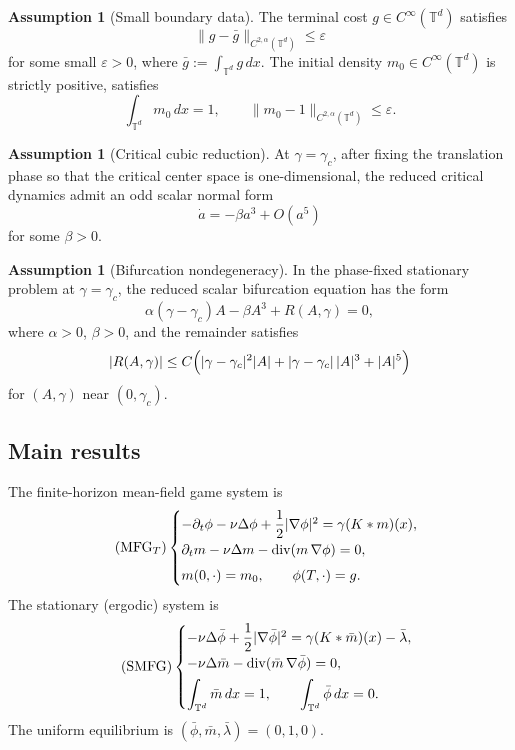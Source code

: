 \documentclass[11pt]{amsart}
\theoremstyle{definition}
\newtheorem{assumption}[theorem]{Assumption}
\theoremstyle{remark}
\newcommand{\Td}{\mathbb{T}^d}
\newcommand{\bphi}{\bar{\phi}}
\newcommand{\barm}{\bar{m}}
\newcommand{\blam}{\bar{\lambda}}
\newcommand{\gamc}{\gamma_c}
\newcommand{\Div}{\operatorname{div}}
\newcommand{\grad}{\nabla}
\newcommand{\eps}{\varepsilon}
\begin{document}
\begin{assumption}[Small boundary data]
\label{ass:small-data}
The terminal cost $g\in C^\infty(\Td)$ satisfies
\[
\|g-\bar g\|_{C^{2,\alpha}(\Td)}\le \eps
\]
for some small $\eps>0$, where $\bar g := \int_{\Td}g\,dx$.
The initial density $m_0\in C^\infty(\Td)$ is strictly positive, satisfies
\[
\int_{\Td}m_0\,dx=1,
\qquad
\|m_0-1\|_{C^{2,\alpha}(\Td)}\le \eps.
\]
\end{assumption}

\begin{assumption}[Critical cubic reduction]
\label{ass:critical-cubic}
At $\gamma=\gamc$, after fixing the translation phase so that the critical center space is one-dimensional, the reduced critical dynamics admit an odd scalar normal form
\[
\dot a = -\beta a^3 + O(a^5)
\]
for some $\beta>0$.
\end{assumption}

\begin{assumption}[Bifurcation nondegeneracy]
\label{ass:bif-nondeg}
In the phase-fixed stationary problem at $\gamma=\gamc$, the reduced scalar bifurcation equation has the form
\[
\alpha(\gamma-\gamc)A-\beta A^3 + R(A,\gamma)=0,
\]
where $\alpha>0$, $\beta>0$, and the remainder satisfies
\[
|R(A,\gamma)|\le C\Bigl(|\gamma-\gamc|^2|A| + |\gamma-\gamc|\,|A|^3 + |A|^5\Bigr)
\]
for $(A,\gamma)$ near $(0,\gamc)$.
\end{assumption}

\subsection{Main results}
\label{sub:main-results}

The finite-horizon mean-field game system is
\begin{equation}
\label{eq:MFG}
\tag{$\mathrm{MFG}_T$}
\begin{cases}
-\partial_t \phi - \nu\Delta \phi + \dfrac12|\grad\phi|^2 = \gamma(K*m)(x), \\[4pt]
\partial_t m - \nu\Delta m - \Div(m\,\grad\phi)=0, \\[4pt]
m(0,\cdot)=m_0,\qquad \phi(T,\cdot)=g.
\end{cases}
\end{equation}
The stationary (ergodic) system is
\begin{equation}
\label{eq:SMFG}
\tag{$\mathrm{SMFG}$}
\begin{cases}
-\nu\Delta \bphi + \dfrac12|\grad\bphi|^2 = \gamma(K*\barm)(x)-\blam, \\[4pt]
-\nu\Delta \barm - \Div(\barm\,\grad\bphi)=0, \\[4pt]
\displaystyle \int_{\Td}\barm\,dx=1,\qquad \displaystyle \int_{\Td}\bphi\,dx=0.
\end{cases}
\end{equation}
The uniform equilibrium is $(\bphi,\barm,\blam)=(0,1,0)$.
\end{document}
